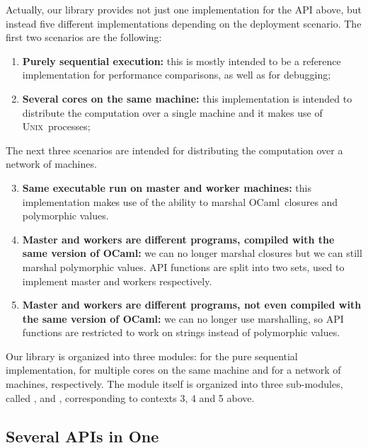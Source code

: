 \documentclass{llncs}
\newcommand{\Ocaml}{OCaml}
\newcommand{\unix}{\textsc{Unix}}
\begin{document}
Actually, our library provides not just one implementation for the API above,
but instead five different implementations
depending on the deployment scenario. 
The first two scenarios are the following: 
\begin{enumerate}
\item \textbf{Purely sequential execution:}
  this is mostly intended to be a reference implementation
  for performance comparisons, as well as for debugging;

\item \textbf{Several cores on the same machine:} 
  this implementation is intended to distribute the computation over a
  single machine and it makes use of \unix\ processes;
\end{enumerate}
The next three scenarios are intended for distributing the
computation over a network of machines.
\begin{enumerate}
\setcounter{enumi}{2}
\item \textbf{Same executable run on master and worker machines:}
  this implementation makes use of the ability to marshal \Ocaml\
  closures and polymorphic values.

\item \textbf{Master and workers are different programs, compiled with
    the same version of \Ocaml:} 
  we can no longer marshal closures but we can still
  marshal polymorphic values. API functions are split into two sets,
  used to implement master and workers respectively.

\item \textbf{Master and workers are different programs, not even
    compiled with the same version of \Ocaml:} we can no
  longer use marshalling, so API functions are restricted to work on
  strings instead of polymorphic values.
\end{enumerate}
Our library is organized into three modules:  for the
pure sequential implementation, \of{Cores} for multiple cores on the
same machine and  for a network of machines, respectively.
The \of{Network} module itself is organized into three sub-modules,
called \of{Same}, \of{Poly} and \of{Mono},
corresponding to contexts 3, 4 and 5 above. 

\subsection{Several APIs in One}
\end{document}
